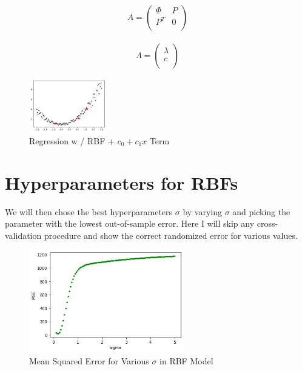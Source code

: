 \documentclass[12pt]{article}
\begin{document}
\begin{align*}
A = 
\begin{pmatrix}
\Phi & P \\
P^T & 0 \\
\end{pmatrix}
\end{align*}

\begin{align*}
\Lambda = 
\begin{pmatrix}
\lambda \\
c \\
\end{pmatrix}
\end{align*}

\begin{figure}[h]
\centering
\includegraphics[width=0.3\textwidth]{Post_3_linearterm}
\caption{Regression w / RBF + $c_0+c_1x$ Term}
\end{figure}

\section{Hyperparameters for RBFs}

We will then chose the best hyperparameters $\sigma$ by varying $\sigma$ and picking the parameter with the lowest out-of-sample error. Here I will skip any cross-validation procedure and show the correct randomized error for various values. 

\begin{figure}[h]
\centering
\includegraphics[width=0.6\textwidth]{Post_3_sigma}
\caption{Mean Squared Error for Various $\sigma$ in RBF Model}
\end{figure}
\end{document}
